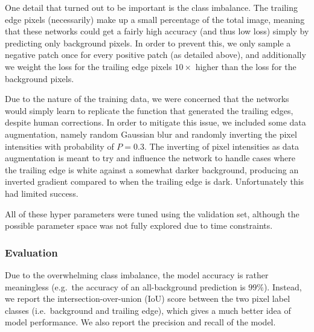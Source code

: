 One detail that turned out to be important is the class imbalance.
The trailing edge pixels (necessarily) make up a small percentage of the total image, meaning that these networks could get a fairly high accuracy (and thus low loss) simply by predicting only background pixels.
In order to prevent this, we only sample a negative patch once for every positive patch (as detailed above), and additionally we weight the loss for the trailing edge pixels $10\times$ higher than the loss for the background pixels.

Due to the nature of the training data, we were concerned that the networks would simply learn to replicate the function that generated the trailing edges, despite human corrections.
In order to mitigate this issue, we included some data augmentation, namely random Gaussian blur and randomly inverting the pixel intensities with probability of $P=0.3$.
The inverting of pixel intensities as data augmentation is meant to try and influence the network to handle cases where the trailing edge is white against a somewhat darker background, producing an inverted gradient compared to when the trailing edge is dark.
Unfortunately this had limited success.


All of these hyper parameters were tuned using the validation set, although the possible parameter space was not fully explored due to time constraints.

\subsubsection{Evaluation}

Due to the overwhelming class imbalance, the model accuracy is rather meaningless (e.g.\ the accuracy of an all-background prediction is $99\%$).
Instead, we report the intersection-over-union (IoU) score between the two pixel label classes (i.e.\ background and trailing edge), which gives a much better idea of model performance.
We also report the precision and recall of the model.



